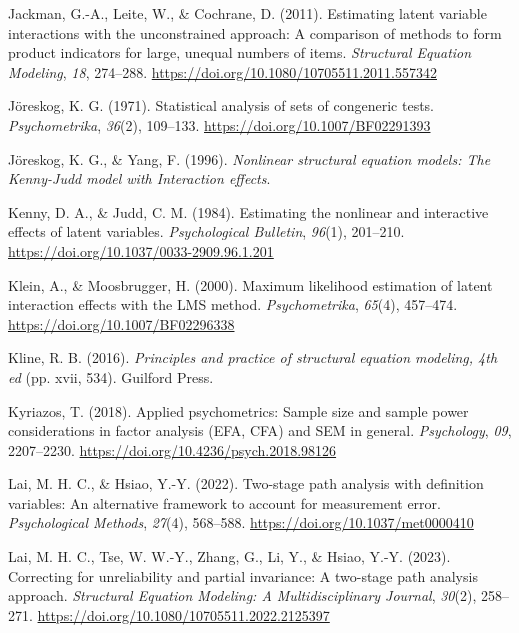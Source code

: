 \documentclass[
  man]{apa6}
\newlength{\cslhangindent}
\newenvironment{CSLReferences}[2] %
 {\begin{list}{}{%
  \setlength{\itemindent}{0pt}
  \setlength{\leftmargin}{0pt}
  \setlength{\parsep}{0pt}
  \ifodd #1
   \setlength{\leftmargin}{\cslhangindent}
   \setlength{\itemindent}{-1\cslhangindent}
  \fi
  \setlength{\itemsep}{#2\baselineskip}}}
 {\end{list}}
\begin{document}
\begin{CSLReferences}{1}{0}
Jackman, G.-A., Leite, W., \& Cochrane, D. (2011). Estimating latent variable interactions with the unconstrained approach: {A} comparison of methods to form product indicators for large, unequal numbers of items. \emph{Structural Equation Modeling}, \emph{18}, 274--288. \url{https://doi.org/10.1080/10705511.2011.557342}

Jöreskog, K. G. (1971). Statistical analysis of sets of congeneric tests. \emph{Psychometrika}, \emph{36}(2), 109--133. \url{https://doi.org/10.1007/BF02291393}

Jöreskog, K. G., \& Yang, F. (1996). \emph{Nonlinear structural equation models: {The Kenny-Judd} model with {Interaction} effects}.

Kenny, D. A., \& Judd, C. M. (1984). Estimating the nonlinear and interactive effects of latent variables. \emph{Psychological Bulletin}, \emph{96}(1), 201--210. \url{https://doi.org/10.1037/0033-2909.96.1.201}

Klein, A., \& Moosbrugger, H. (2000). Maximum likelihood estimation of latent interaction effects with the {LMS} method. \emph{Psychometrika}, \emph{65}(4), 457--474. \url{https://doi.org/10.1007/BF02296338}

Kline, R. B. (2016). \emph{Principles and practice of structural equation modeling, 4th ed} (pp. xvii, 534). Guilford Press.

Kyriazos, T. (2018). Applied psychometrics: {Sample} size and sample power considerations in factor analysis ({EFA}, {CFA}) and {SEM} in general. \emph{Psychology}, \emph{09}, 2207--2230. \url{https://doi.org/10.4236/psych.2018.98126}

Lai, M. H. C., \& Hsiao, Y.-Y. (2022). Two-stage path analysis with definition variables: {An} alternative framework to account for measurement error. \emph{Psychological Methods}, \emph{27}(4), 568--588. \url{https://doi.org/10.1037/met0000410}

Lai, M. H. C., Tse, W. W.-Y., Zhang, G., Li, Y., \& Hsiao, Y.-Y. (2023). Correcting for unreliability and partial invariance: {A} two-stage path analysis approach. \emph{Structural Equation Modeling: A Multidisciplinary Journal}, \emph{30}(2), 258--271. \url{https://doi.org/10.1080/10705511.2022.2125397}


\end{CSLReferences}
\end{document}

